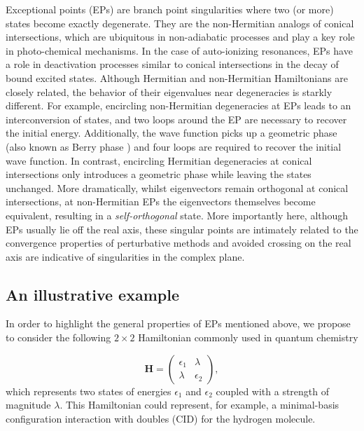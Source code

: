 \documentclass[aps,prb,reprint,noshowkeys,superscriptaddress]{revtex4-1}
\newcommand{\bH}{\mathbf{H}}
\begin{document}
Exceptional points (EPs) are branch point singularities where two (or more) states become exactly degenerate. \cite{MoiseyevBook,Heiss_1988,Heiss_1990,Heiss_1999,Berry_2011,Heiss_2012,Heiss_2016,Benda_2018}
They are the non-Hermitian analogs of conical intersections, \cite{Yarkony_1996} which are ubiquitous in non-adiabatic processes and play a key role in photo-chemical mechanisms.
In the case of auto-ionizing resonances, EPs have a role in deactivation processes similar to conical intersections in the decay of bound excited states. \cite{Benda_2018}
Although Hermitian and non-Hermitian Hamiltonians are closely related, the behavior of their eigenvalues near degeneracies is starkly different.
For example, encircling non-Hermitian degeneracies at EPs leads to an interconversion of states, and two loops around the EP are necessary to recover the initial energy. \cite{MoiseyevBook,Heiss_2016,Benda_2018}
Additionally, the wave function picks up a geometric phase (also known as Berry phase \cite{Berry_1984}) and four loops are required to recover the initial wave function.
In contrast, encircling Hermitian degeneracies at conical intersections only introduces a geometric phase while leaving the states unchanged.
More dramatically, whilst eigenvectors remain orthogonal at conical intersections, at non-Hermitian EPs the eigenvectors themselves become equivalent, resulting in a \textit{self-orthogonal} state. \cite{MoiseyevBook}
More importantly here, although EPs usually lie off the real axis, these singular points are intimately related to the convergence properties of perturbative methods and avoided crossing on the real axis are indicative of singularities in the complex plane. \cite{BenderBook,Olsen_1996,Olsen_2000,Olsen_2019,Mihalka_2017a,Mihalka_2017b,Mihalka_2019}

\subsection{An illustrative example}
In order to highlight the general properties of EPs mentioned above, we propose to consider the following $2 \times 2$ Hamiltonian commonly used in quantum chemistry

\begin{equation}
\label{eq:H_2x2}
	\bH = 
	\begin{pmatrix}
		\epsilon_1	&	\lambda	\\
		\lambda		&	\epsilon_2
	\end{pmatrix},
\end{equation}
which represents two states of energies $\epsilon_1$ and $\epsilon_2$ coupled with a strength of magnitude $\lambda$.
This Hamiltonian could represent, for example, a minimal-basis configuration interaction with doubles (CID) for the hydrogen molecule. \cite{SzaboBook}
\end{document}
